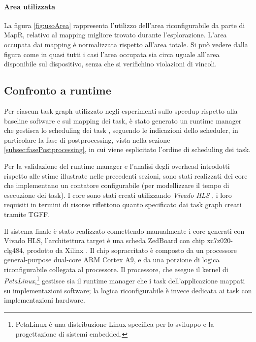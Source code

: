 \paragraph{Area utilizzata}
La figura \ref{fig:usoArea} rappresenta l'utilizzo dell'area
riconfigurabile da parte di MapR, relativo al mapping migliore trovato durante
l'esplorazione. L'area occupata dai mapping \`e normalizzata rispetto all'area totale.
Si pu\`o vedere dalla figura come in quasi tutti i casi l'area occupata sia
circa uguale all'area disponibile sul dispositivo, senza che si verifichino
violazioni di vincoli.



\subsection{Confronto a runtime}
Per ciascun task graph utilizzato negli esperimenti sullo speedup rispetto alla baseline software
e sul mapping dei task, \`e stato generato un runtime manager che gestisca lo scheduling dei task \cite{DurelliRuntimeManager},
seguendo le indicazioni dello scheduler, in particolare la fase di postprocessing, vista nella sezione
\ref{subsec:fasePostprocessing}, in cui viene esplicitato l'ordine di scheduling dei task.

Per la validazione del runtime manager e l'analisi degli overhead introdotti rispetto alle stime
illustrate nelle precedenti sezioni, sono stati realizzati dei core che implementano un contatore
configurabile (per modellizzare il tempo di esecuzione dei task). I core sono stati creati utilizzando
\emph{Vivado HLS} \cite{VivadoHLS}, i loro requisiti in termini di risorse riflettono quanto
specificato dai task graph creati tramite \ac{TGFF}.

Il sistema finale \`e stato realizzato connettendo manualmente i core generati con Vivado HLS,
l'architettura target \`e una scheda ZedBoard con chip xc7z020-clg484, prodotto da Xilinx
\cite{XilinxZC702}. Il chip sopraccitato \`e composto da un processore general-purpose dual-core
ARM Cortex A9, e da una porzione di logica riconfigurabile collegata al processore.
Il processore, che esegue il kernel di \emph{PetaLinux},\footnote{PetaLinux \`e una distribuzione
Linux specifica per lo sviluppo e la progettazione di sistemi embedded.} gestisce
sia il runtime manager che i task dell'applicazione mappati su implementazioni software;
la logica riconfigurabile \`e invece dedicata ai task con implementazioni hardware.

